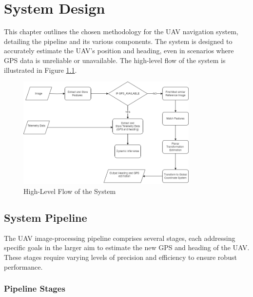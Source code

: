 

\chapter{System Design}

This chapter outlines the chosen methodology for the UAV navigation system, detailing the pipeline and its various components. The system is designed to accurately estimate the UAV's position and heading, even in scenarios where GPS data is unreliable or unavailable. The high-level flow of the system is illustrated in Figure \ref{fig:HighLevelFlow}.

\begin{figure}[H]
    \centering
    \includegraphics[width=0.8\textwidth]{Chapter 3/Chap3Figs/HighLevelFlow.png}
    \caption{High-Level Flow of the System}
    \label{fig:HighLevelFlow}
\end{figure}




\section{System Pipeline}

The UAV image-processing pipeline comprises several stages, each addressing specific goals in the larger aim to estimate the new GPS and heading of the UAV. These stages require varying levels of precision and efficiency to ensure robust performance.

\subsection{Pipeline Stages}

